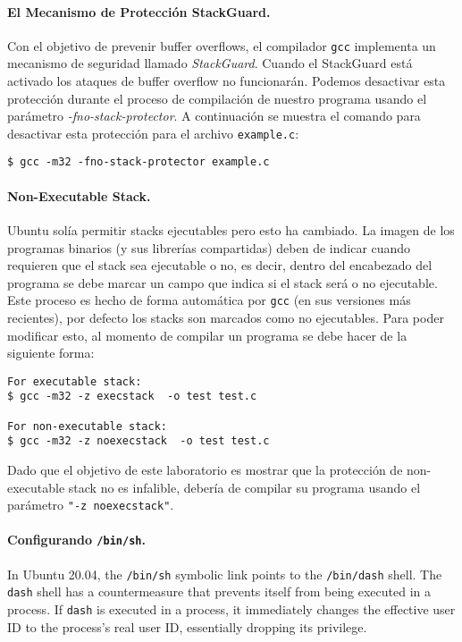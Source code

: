 \paragraph{El Mecanismo de Protección StackGuard.}
Con el objetivo de prevenir buffer overflows, el compilador \texttt{gcc} implementa un mecanismo de seguridad llamado \textit{StackGuard}. Cuando el StackGuard está activado los ataques de buffer overflow no funcionarán. Podemos desactivar esta protección durante el proceso de compilación de nuestro programa usando el parámetro \emph{-fno-stack-protector}.
A continuación se muestra el comando para desactivar esta protección para el archivo \texttt{example.c}:

\begin{lstlisting}
$ gcc -m32 -fno-stack-protector example.c
\end{lstlisting}


\paragraph{Non-Executable Stack.} Ubuntu solía permitir stacks ejecutables pero esto ha cambiado. La imagen de los programas binarios (y sus librerías compartidas) deben de indicar cuando requieren que el stack sea ejecutable o no, es decir, dentro del encabezado del programa se debe marcar un campo que indica si el stack será o no ejecutable. Este proceso es hecho de forma automática por {\tt gcc} (en sus versiones más recientes), por defecto los stacks son marcados como no ejecutables.
Para poder modificar esto, al momento de compilar un programa se debe hacer de la siguiente forma:

\begin{lstlisting}
For executable stack:
$ gcc -m32 -z execstack  -o test test.c

For non-executable stack:
$ gcc -m32 -z noexecstack  -o test test.c
\end{lstlisting}


Dado que el objetivo de este laboratorio es mostrar que la protección de non-executable stack no es infalible, debería de compilar su programa usando el parámetro {\tt "-z noexecstack"}.



\paragraph{Configurando \texttt{/bin/sh}.} In Ubuntu 20.04, 
the \texttt{/bin/sh} symbolic link points to
the \texttt{/bin/dash} shell. 
The \texttt{dash} shell has a countermeasure
that prevents itself from being executed in a \setuid process.
If \texttt{dash} is 
executed in a \setuid process, it immediately
changes the effective user ID to the process's real user ID, essentially
dropping its privilege. 

